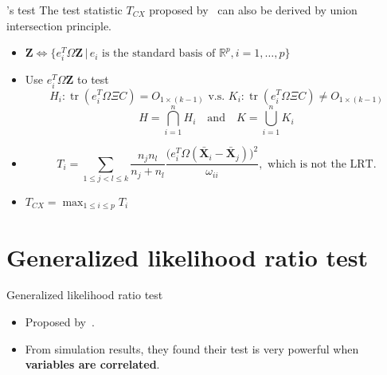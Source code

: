 \documentclass{beamer}
\DeclareMathOperator{\mytr}{tr}
\newcommand{\bZ}{\mathbf{Z}}
\newcommand{\bX}{\mathbf{X}}
\theoremstyle{plain}
\theoremstyle{definition}
\theoremstyle{remark}
\begin{document}
\begin{frame}{\cite{Cai2014High}'s test}
    The test statistic $T_{CX}$ proposed by~\cite{Cai2014High} can also be derived by union intersection principle.
    \begin{itemize}
        \item
            $
            \bZ \Longleftrightarrow \big\{ e_i^T\Omega \bZ\,|\, e_i\text{ is the standard basis of $\mathbb{R}^p$},i=1,\ldots,p\big\}
            $
        \item
            Use $e_i^T  \Omega \bZ$ to test 
            $$H_i: \mytr (e_i^T \Omega \Xi C)=O_{1\times (k-1)} \text{ v.s. } K_i: \mytr (e_i^T \Omega \Xi C)\neq O_{1\times (k-1)}$$
            $$
            H=\bigcap_{i=1}^n H_i\quad\text{and}\quad K=\bigcup_{i=1}^n K_i
            $$
        \item
            $$
            T_i=\sum_{1\leq j<l\leq k}\frac{n_j n_l}{n_j+n_l}\frac{\big(e_i^T \Omega (\bar{\bX}_i-\bar{\bX}_j)\big)^2}{\omega_{ii}},\text{ which is not the LRT.}
            $$
        \item
            $T_{CX}=\max_{1\leq i\leq p} T_i$
    \end{itemize}
\end{frame}
\section{Generalized likelihood ratio test}
\begin{frame}{Generalized likelihood ratio test}
    \begin{itemize}
        \item
 Proposed by~\cite{Zhao2016A}.
        \item
            From simulation results, they found their test is very powerful when \textbf{variables are correlated}.
    \end{itemize}
\end{frame}
\end{document}
